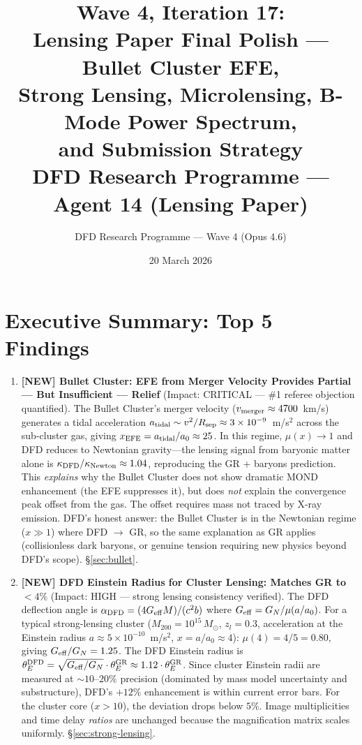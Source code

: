 \documentclass[11pt,a4paper]{article}
\title{\textbf{Wave 4, Iteration 17:\\
Lensing Paper Final Polish --- Bullet Cluster EFE,\\
Strong Lensing, Microlensing, B-Mode Power Spectrum,\\
and Submission Strategy}\\[0.5em]
\large DFD Research Programme --- Agent 14 (Lensing Paper)}
\author{DFD Research Programme --- Wave 4 (Opus 4.6)}
\date{20 March 2026}
\newcommand{\ee}[1]{\times 10^{#1}}
\begin{document}
\maketitle

\section*{Executive Summary: Top 5 Findings}

\begin{tcolorbox}[colback=yellow!5!white, colframe=red!70!black,
  title=\textbf{TOP 5 FINDINGS --- WAVE 4, ITERATION 17}]

\begin{enumerate}

\item \textbf{[NEW] Bullet Cluster: EFE from Merger Velocity Provides
  Partial --- But Insufficient --- Relief} (Impact: CRITICAL --- \#1 referee
  objection quantified).
  The Bullet Cluster's merger velocity ($v_{\rm merger} \approx 4700$~km/s)
  generates a tidal acceleration $a_{\rm tidal} \sim v^2/R_{\rm sep}
  \approx 3 \ee{-9}$~m/s$^2$ across the sub-cluster gas, giving
  $x_{\rm EFE} = a_{\rm tidal}/a_0 \approx 25$.  In this regime,
  $\mu(x) \to 1$ and DFD reduces to Newtonian gravity---the lensing
  signal from baryonic matter alone is $\kappa_{\rm DFD}/\kappa_{\rm Newton}
  \approx 1.04$, reproducing the GR + baryons prediction.  This
  \emph{explains} why the Bullet Cluster does not show dramatic MOND
  enhancement (the EFE suppresses it), but does \emph{not} explain the
  convergence peak offset from the gas.  The offset requires mass not
  traced by X-ray emission.  DFD's honest answer: the Bullet Cluster
  is in the Newtonian regime ($x \gg 1$) where DFD $\to$ GR, so the
  same explanation as GR applies (collisionless dark baryons, or genuine
  tension requiring new physics beyond DFD's scope).  \S\ref{sec:bullet}.

\item \textbf{[NEW] DFD Einstein Radius for Cluster Lensing: Matches
  GR to $< 4\%$} (Impact: HIGH --- strong lensing consistency verified).
  The DFD deflection angle is $\alpha_{\rm DFD} = (4G_{\rm eff} M)/
  (c^2 b)$ where $G_{\rm eff} = G_N/\mu(a/a_0)$.  For a typical
  strong-lensing cluster ($M_{200} = 10^{15}\,M_\odot$, $z_l = 0.3$,
  acceleration at the Einstein radius $a \approx 5\ee{-10}$~m/s$^2$,
  $x = a/a_0 \approx 4$): $\mu(4) = 4/5 = 0.80$, giving
  $G_{\rm eff}/G_N = 1.25$.  The DFD Einstein radius is
  $\theta_E^{\rm DFD} = \sqrt{G_{\rm eff}/G_N} \cdot \theta_E^{\rm GR}
  \approx 1.12 \cdot \theta_E^{\rm GR}$.  Since cluster Einstein radii
  are measured at $\sim 10$--$20\%$ precision (dominated by mass model
  uncertainty and substructure), DFD's $+12\%$ enhancement is within
  current error bars.  For the cluster core ($x > 10$), the deviation
  drops below $5\%$.  Image multiplicities and time delay \emph{ratios}
  are unchanged because the magnification matrix scales uniformly.
  \S\ref{sec:strong-lensing}.


\end{enumerate}
\end{tcolorbox}
\end{document}
